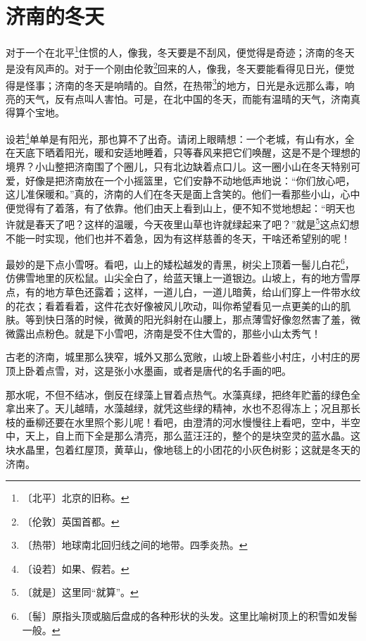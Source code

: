 \documentclass[12pt,UTF-8,openany]{ctexbook}
\begin{document}
\chapter{济南的冬天}

\begin{normalsize}
    
    对于一个在北平\footnote{〔北平〕北京的旧称。}住惯的人，像我，冬天要是不刮风，便觉得是奇迹；济南的冬天是没有风声的。对于一个刚由伦敦\footnote{〔伦敦〕英国首都。}回来的人，像我，冬天要能看得见日光，便觉得是怪事；济南的冬天是响晴的。自然，在热带\footnote{〔热带〕地球南北回归线之间的地带。四季炎热。}的地方，日光是永远那么毒，响亮的天气，反有点叫人害怕。可是，在北中国的冬天，而能有温晴的天气，济南真得算个宝地。
    
    设若\footnote{〔设若〕如果、假若。}单单是有阳光，那也算不了出奇。请闭上眼睛想：一个老城，有山有水，全在天底下晒着阳光，暖和安适地睡着，只等春风来把它们唤醒，这是不是个理想的境界？小山整把济南围了个圈儿，只有北边缺着点口儿。这一圈小山在冬天特别可爱，好像是把济南放在一个小摇篮里，它们安静不动地低声地说：“你们放心吧，这儿准保暖和。”真的，济南的人们在冬天是面上含笑的。他们一看那些小山，心中便觉得有了着落，有了依靠。他们由天上看到山上，便不知不觉地想起：“明天也许就是春天了吧？这样的温暖，今天夜里山草也许就绿起来了吧？”就是\footnote{〔就是〕这里同“就算”。}这点幻想不能一时实现，他们也并不着急，因为有这样慈善的冬天，干啥还希望别的呢！
    
    最妙的是下点小雪呀。看吧，山上的矮松越发的青黑，树尖上顶着一髻儿白花\footnote{〔髻〕原指头顶或脑后盘成的各种形状的头发。这里比喻树顶上的积雪如发髻一般。}，仿佛雪地里的灰松鼠。山尖全白了，给蓝天镶上一道银边。山坡上，有的地方雪厚点，有的地方草色还露着；这样，一道儿白，一道儿暗黄，给山们穿上一件带水纹的花衣；看着看着，这件花衣好像被风儿吹动，叫你希望看见一点更美的山的肌肤。等到快日落的时候，微黄的阳光斜射在山腰上，那点薄雪好像忽然害了羞，微微露出点粉色。就是下小雪吧，济南是受不住大雪的，那些小山太秀气！
    
    古老的济南，城里那么狭窄，城外又那么宽敞，山坡上卧着些小村庄，小村庄的房顶上卧着点雪，对，这是张小水墨画，或者是唐代的名手画的吧。
    
    那水呢，不但不结冰，倒反在绿藻上冒着点热气。水藻真绿，把终年贮蓄的绿色全拿出来了。天儿越晴，水藻越绿，就凭这些绿的精神，水也不忍得冻上；况且那长枝的垂柳还要在水里照个影儿呢！看吧，由澄清的河水慢慢往上看吧，空中，半空中，天上，自上而下全是那么清亮，那么蓝汪汪的，整个的是块空灵的蓝水晶。这块水晶里，包着红屋顶，黄草山，像地毯上的小团花的小灰色树影；这就是冬天的济南。
    
\end{normalsize}
\end{document}
